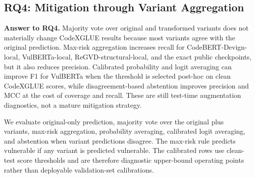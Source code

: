 \documentclass[a4paper,fleqn]{cas-dc}
\begin{document}
\subsection{RQ4: Mitigation through Variant Aggregation}

\textbf{Answer to RQ4.} Majority vote over original and transformed variants
does not materially change CodeXGLUE results because most variants agree with
the original prediction. Max-risk aggregation increases recall for
CodeBERT-Devign-local, VulBERTa-local, ReGVD-structural-local, and the exact
public checkpoints, but it also reduces precision. Calibrated probability and
logit averaging can improve F1 for VulBERTa when the threshold is selected
post-hoc on clean CodeXGLUE scores, while disagreement-based abstention improves
precision and MCC at the cost of coverage and recall. These are still
test-time augmentation diagnostics, not a mature mitigation strategy.

We evaluate original-only prediction, majority vote over the original plus
variants, max-risk aggregation, probability averaging, calibrated logit
averaging, and abstention when variant predictions disagree. The max-risk rule
predicts vulnerable if any variant is predicted vulnerable. The calibrated rows
use clean-test score thresholds and are therefore diagnostic upper-bound
operating points rather than deployable validation-set calibrations.
\end{document}

